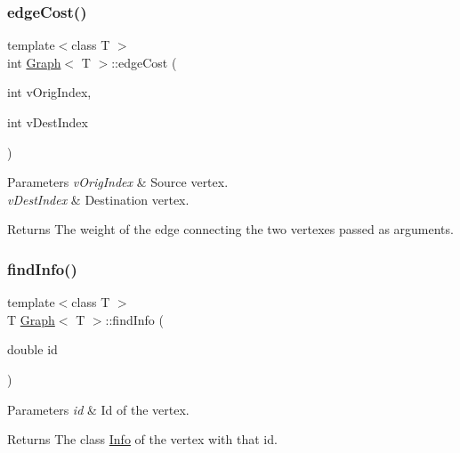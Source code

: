 \subsubsection{\texorpdfstring{edge\+Cost()}{edgeCost()}}
{\footnotesize\ttfamily template$<$class T $>$ \\
int \hyperlink{class_graph}{Graph}$<$ T $>$\+::edge\+Cost (\begin{DoxyParamCaption}\item[{int}]{v\+Orig\+Index,  }\item[{int}]{v\+Dest\+Index }\end{DoxyParamCaption})}


\begin{DoxyParams}{Parameters}
{\em v\+Orig\+Index} & Source vertex. \\
\hline
{\em v\+Dest\+Index} & Destination vertex. \\
\hline
\end{DoxyParams}
\begin{DoxyReturn}{Returns}
The weight of the edge connecting the two vertexes passed as arguments. 
\end{DoxyReturn}
\mbox{\label{class_graph_aa8d29bce3bdde30a467af15cd67bebcf}} 
\subsubsection{\texorpdfstring{find\+Info()}{findInfo()}}
{\footnotesize\ttfamily template$<$class T $>$ \\
T \hyperlink{class_graph}{Graph}$<$ T $>$\+::find\+Info (\begin{DoxyParamCaption}\item[{double}]{id }\end{DoxyParamCaption})}


\begin{DoxyParams}{Parameters}
{\em id} & Id of the vertex.\\
\hline
\end{DoxyParams}
\begin{DoxyReturn}{Returns}
The class \hyperlink{class_info}{Info} of the vertex with that id. 
\end{DoxyReturn}
\mbox{\label{class_graph_a3e43c4322abd26753ed9a33ebba17067}} 
